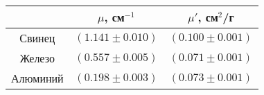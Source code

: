 \begin{tabular}{ccc}
\toprule
& $\mu$, см$^{-1}$ & $\mu'$, см$^2$/г \\
\midrule
Свинец   & $(1.141 \pm 0.010)$ & $(0.100 \pm 0.001)$ \\
Железо   & $(0.557 \pm 0.005)$ & $(0.071 \pm 0.001)$ \\
Алюминий & $(0.198 \pm 0.003)$ & $(0.073 \pm 0.001)$ \\
\bottomrule
\end{tabular}